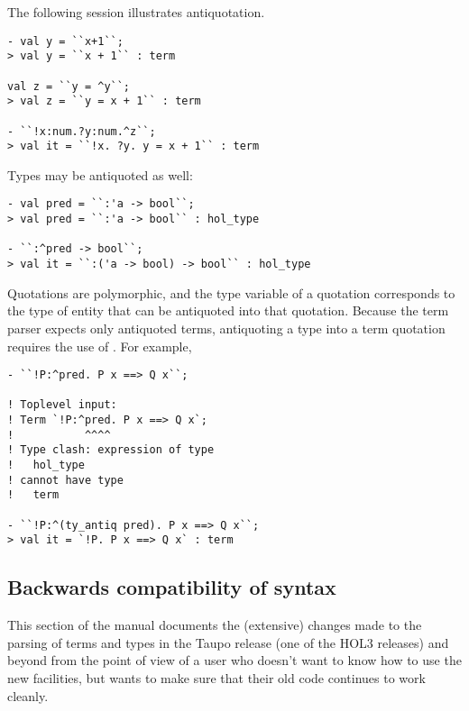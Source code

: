 The following session illustrates antiquotation.

\setcounter{sessioncount}{0}
\begin{session}
\begin{verbatim}
- val y = ``x+1``;
> val y = ``x + 1`` : term

val z = ``y = ^y``;
> val z = ``y = x + 1`` : term

- ``!x:num.?y:num.^z``;
> val it = ``!x. ?y. y = x + 1`` : term
\end{verbatim}
\end{session}

\noindent Types may be antiquoted as well:

\begin{session}
\begin{verbatim}
- val pred = ``:'a -> bool``;
> val pred = ``:'a -> bool`` : hol_type

- ``:^pred -> bool``;
> val it = ``:('a -> bool) -> bool`` : hol_type
\end{verbatim}
\end{session}

\noindent Quotations are polymorphic, and the type variable of a
quotation corresponds to the type of entity that can be antiquoted
into that quotation.  Because the term parser expects only antiquoted
terms, antiquoting a type into a term quotation requires the use of
. For example,%
%

\begin{session}
\begin{verbatim}
- ``!P:^pred. P x ==> Q x``;

! Toplevel input:
! Term `!P:^pred. P x ==> Q x`;
!           ^^^^
! Type clash: expression of type
!   hol_type
! cannot have type
!   term

- ``!P:^(ty_antiq pred). P x ==> Q x``;
> val it = `!P. P x ==> Q x` : term
\end{verbatim}
\end{session}
%



\subsection{Backwards compatibility of syntax}

This section of the manual documents the (extensive) changes made to
the parsing of \HOL{} terms and types in the Taupo release (one of the
HOL3 releases) and beyond from the point of view of a user who doesn't
want to know how to use the new facilities, but wants to make sure
that their old code continues to work cleanly.

